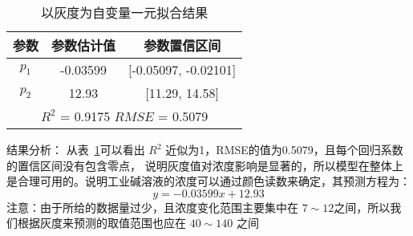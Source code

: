     \begin{table}[H]
        \centering
        \caption{以灰度为自变量一元拟合结果}
        \label{灰度工业碱一元拟合}
        \begin{tabular}{@{}ccc@{}}
        \toprule
        参数       & 参数估计值      & 参数置信区间                     \\ \midrule
        $p_1$    & -0.03599   & {[}-0.05097, -0.02101{]}   \\
        $p_2$    & 12.93      & {[}11.29, 14.58{]}         \\
        \hline
        \multicolumn{3}{c}{$R^2$ = 0.9175 $RMSE$ = 0.5079} \\ \bottomrule
        \end{tabular}
        \end{table}

    结果分析： 从表~\ref{灰度工业碱一元拟合}可以看出 $R^2$ 近似为1，RMSE的值为0.5079，且每个回归系数的置信区间没有包含零点，
    说明灰度值对浓度影响是显著的，所以模型在整体上是合理可用的。说明工业碱溶液的浓度可以通过颜色读数来确定，其预测方程为：
        $$y = -0.03599 x + 12.93 $$
    注意：由于所给的数据量过少，且浓度变化范围主要集中在 $7 \sim 12$之间，所以我们根据灰度来预测的取值范围也应在 $40 \sim 140$
    之间

